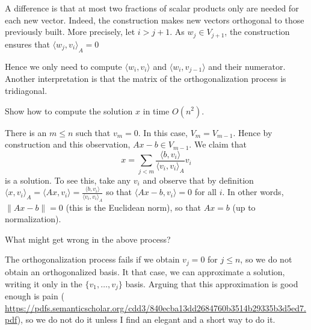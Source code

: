 \documentclass[11pt]{exam}
\newcommand*{\ScProd}[2]{\ensuremath{\langle#1\!\mathbin{,}\!#2\rangle}} %
\theoremstyle{definition}
\begin{document}
{\begin{questions}
\begin{solution}
                          A difference is that at most two fractions of scalar products only are needed for each new vector. Indeed, the construction makes new vectors orthogonal to those previously built. More precisely, let $i>j+1$. As $w_{j} \in V_{j+1}$, the construction ensures that $\ScProd{w_j}{v_i}_A=0$
                        

                          Hence we only need to compute $\ScProd{w_i}{v_i}$ and $\ScProd{w_i}{v_{j-1}}$ and their numerator. Another interpretation is that the matrix of the orthogonalization process is tridiagonal.
			
				\end{solution}
                                \question Show how to compute the solution $x$ in time $O(n^2)$.

                                \begin{solution}
                                  There is an $m\leq n$ such that $v_m=0$. In this case, $V_m=V_{m-1}$. Hence by construction and this observation, $Ax-b \in V_{m-1}$. We claim that $$x=\sum_{j<m} \frac{\ScProd{b}{v_i}}{\ScProd{v_i}{v_i}_A}v_i$$
                                  is a solution. To see this, take any $v_i$ and observe that by definition $\ScProd{x}{v_i}_A=\ScProd{Ax}{v_i}=\frac{\ScProd{b}{v_i}}{\ScProd{v_i}{v_i}_A}$ so that $\ScProd{Ax-b}{v_i}=0$ for all $i$. In other words, $\|Ax-b\|=0$ (this is the Euclidean norm), so that $Ax=b$ (up to normalization).
                                  
                                  \end{solution}
                                
		\question What might get wrong in the above process? 
			\begin{solution}
				The orthogonalization process fails if we obtain $v_j = 0$ for $j\leq n$, so we do not obtain an orthogonalized basis. It that case, we can approximate a solution, writing it only in the $\{v_1, \ldots, v_j\}$ basis. Arguing that this approximation is good enough is pain ( \url{https://pdfs.semanticscholar.org/cdd3/840ecba13dd2684760b3514b29335b3d5ed7.pdf}), so we do not do it unless I find an elegant and a short way to do it. 
			\end{solution}
	\end{questions}
}
\end{document}
